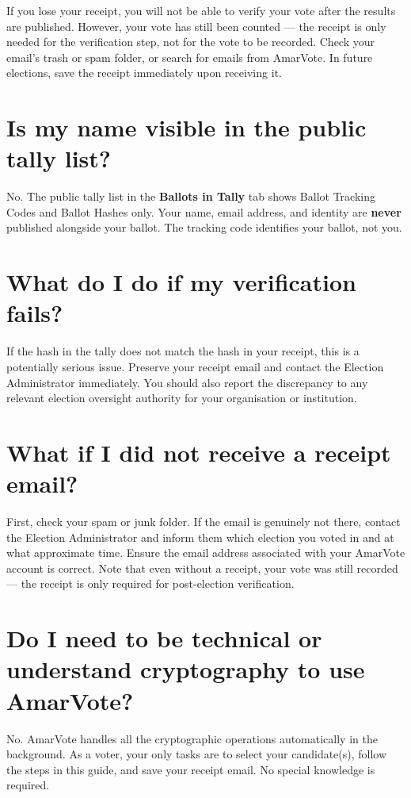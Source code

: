 \documentclass[12pt,a4paper,openany]{book}
\newcommand{\uimenu}[1]{\textbf{\color{primaryblue}#1}}
\begin{document}
If you lose your receipt, you will not be able to verify your vote after the results are published. However, your vote has still been counted --- the receipt is only needed for the verification step, not for the vote to be recorded. Check your email's trash or spam folder, or search for emails from AmarVote. In future elections, save the receipt immediately upon receiving it.

\section*{Is my name visible in the public tally list?}

No. The public tally list in the \uimenu{Ballots in Tally} tab shows Ballot Tracking Codes and Ballot Hashes only. Your name, email address, and identity are \textbf{never} published alongside your ballot. The tracking code identifies your ballot, not you.

\section*{What do I do if my verification fails?}

If the hash in the tally does not match the hash in your receipt, this is a potentially serious issue. Preserve your receipt email and contact the Election Administrator immediately. You should also report the discrepancy to any relevant election oversight authority for your organisation or institution.

\section*{What if I did not receive a receipt email?}

First, check your spam or junk folder. If the email is genuinely not there, contact the Election Administrator and inform them which election you voted in and at what approximate time. Ensure the email address associated with your AmarVote account is correct. Note that even without a receipt, your vote was still recorded --- the receipt is only required for post-election verification.

\section*{Do I need to be technical or understand cryptography to use AmarVote?}

No. AmarVote handles all the cryptographic operations automatically in the background. As a voter, your only tasks are to select your candidate(s), follow the steps in this guide, and save your receipt email. No special knowledge is required.
\end{document}
